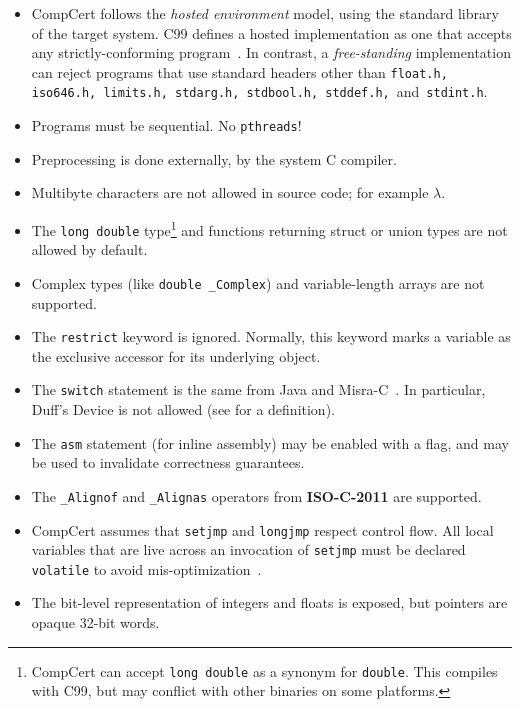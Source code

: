 \begin{itemize}
\item
  CompCert follows the \emph{hosted environment} model, using the standard library of the target system.
  C99 defines a hosted implementation as one that accepts any strictly-conforming program~\cite{iso-c99}.
  In contrast, a \emph{free-standing} implementation can reject programs that use standard headers other than
   {\tt float.h, iso646.h, limits.h, stdarg.h, stdbool.h, stddef.h,}~and~{\tt stdint.h}.
\item
  Programs must be sequential.
  No {\tt pthreads}!
\item
  Preprocessing is done externally, by the system C compiler.
\item
  Multibyte characters are not allowed in source code; for example $\lambda$.
\item
  The {\tt long double} type\footnote{CompCert can accept {\tt long double} as a synonym for {\tt double}. This compiles with C99, but may conflict with other binaries on some platforms.} and functions returning struct or union types are not allowed by default.
\item
  Complex types (like {\tt double \_Complex}) and variable-length arrays are not supported.
\item
  The {\tt restrict} keyword is ignored.
  Normally, this keyword marks a variable as the exclusive accessor for its underlying object.
\item
  The {\tt switch} statement is the same from Java and Misra-C~\cite{java-spec,misra-spec}.
  In particular, Duff's Device is not allowed (see  for a definition).
\item
  The {\tt asm} statement (for inline assembly) may be enabled with a flag, and may be used to invalidate correctness guarantees.
\item
  The {\tt \_Alignof} and {\tt \_Alignas} operators from {\bf ISO-C-2011} are supported.
\item
  CompCert assumes that {\tt setjmp} and {\tt longjmp} respect control flow.
  All local variables that are live across an invocation of {\tt setjmp} must be declared {\tt volatile} to avoid mis-optimization~\cite{refman}.
\item
  The bit-level representation of integers and floats is exposed, but pointers are opaque 32-bit words.

\end{itemize}
